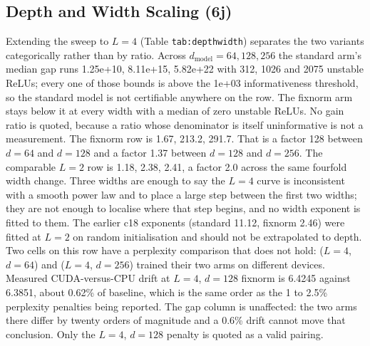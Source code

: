 \documentclass[10pt,journal]{IEEEtran}
\begin{document}
\subsection{Depth and Width Scaling (6j)}
Extending the sweep to $L=4$ (Table \texttt{tab:depthwidth}) separates the two variants categorically rather than by ratio. Across $d_{\text{model}}=64,128,256$ the standard arm's median gap runs 1.25e+10, 8.11e+15, 5.82e+22 with 312, 1026 and 2075 unstable ReLUs; every one of those bounds is above the 1e+03 informativeness threshold, so the standard model is not certifiable anywhere on the row. The fixnorm arm stays below it at every width with a median of zero unstable ReLUs. No gain ratio is quoted, because a ratio whose denominator is itself uninformative is not a measurement.
The fixnorm row is 1.67, 213.2, 291.7. That is a factor 128 between $d=64$ and $d=128$ and a factor 1.37 between $d=128$ and $d=256$. The comparable $L=2$ row is 1.18, 2.38, 2.41, a factor 2.0 across the same fourfold width change. Three widths are enough to say the $L=4$ curve is inconsistent with a smooth power law and to place a large step between the first two widths; they are not enough to localise where that step begins, and no width exponent is fitted to them. The earlier c18 exponents (standard 11.12, fixnorm 2.46) were fitted at $L=2$ on random initialisation and should not be extrapolated to depth.
Two cells on this row have a perplexity comparison that does not hold: ($L=4$, $d=64$) and ($L=4$, $d=256$) trained their two arms on different devices. Measured CUDA-versus-CPU drift at $L=4$, $d=128$ fixnorm is 6.4245 against 6.3851, about 0.62\% of baseline, which is the same order as the 1 to 2.5\% perplexity penalties being reported. The gap column is unaffected: the two arms there differ by twenty orders of magnitude and a 0.6\% drift cannot move that conclusion. Only the $L=4$, $d=128$ penalty is quoted as a valid pairing.
\end{document}
